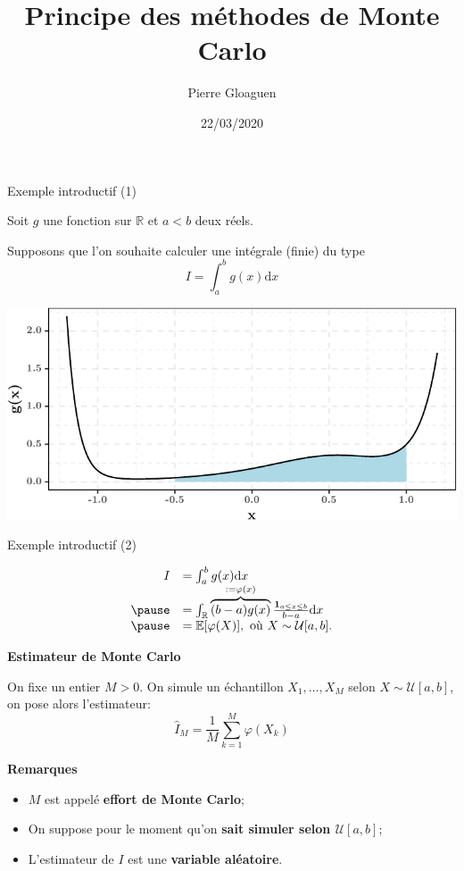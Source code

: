 \documentclass[ignorenonframetext,]{beamer}
\title{Principe des méthodes de Monte Carlo}
\author{Pierre Gloaguen}
\date{22/03/2020}
\providecommand{\tightlist}{%
  \setlength{\itemsep}{0pt}\setlength{\parskip}{0pt}}
\begin{document}
\frame{\titlepage}

\begin{frame}{Exemple introductif (1)}
\protect\hypertarget{exemple-introductif-1}{}

Soit \(g\) une fonction sur \(\mathbb{R}\) et \(a < b\) deux réels.

Supposons que l'on souhaite calculer une intégrale (finie) du type
\[I = \int_a^b g(x) \text{d}x\]

\includegraphics{diapos_monte_carlo_files/figure-beamer/plot_phi-1.pdf}

\end{frame}

\begin{frame}{Exemple introductif (2)}
\protect\hypertarget{exemple-introductif-2}{}

\[\begin{array}{rl}
  I &= \int_a^b g(x) \text{d}x\\
  \pause
  &=  \int_{\mathbb{R}} \overbrace{(b - a) g(x)}^{:= \varphi(x)} \frac{\mathbf{1}_{a\leq x\leq b}}{b - a}\text{d}x\\
  \pause
  &= \mathbb{E}[\varphi(X)], \text{ où } X\sim\mathcal{U}[a,b].
  \end{array}\] \pause

\textbf{Estimateur de Monte Carlo}

On fixe un entier \(M > 0\). On simule un échantillon \(X_1,\dots, X_M\)
selon \(X\sim\mathcal{U}[a,b]\), on pose alors l'estimateur:
\[\hat{I}_M = \frac{1}{M}\sum_{k = 1}^M \varphi(X_k)\] \pause

\textbf{Remarques}

\begin{itemize}
\tightlist
\item
  \(M\) est appelé \textbf{effort de Monte Carlo};
\item
  On suppose pour le moment qu'on \textbf{sait simuler selon
  \(\mathcal{U}[a,b]\)};
\item
  L'estimateur de \(I\) est une \textbf{variable aléatoire}.
\end{itemize}

\end{frame}
\end{document}
